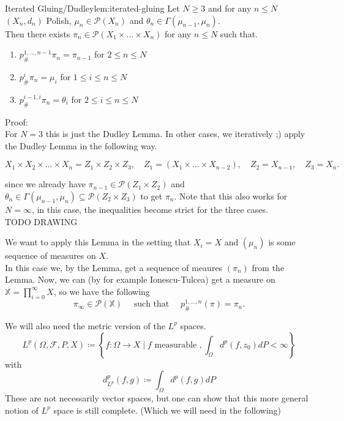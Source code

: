 \documentclass[15pt]{article}
\begin{document}
\begin{lemma}{Iterated Gluing/Dudley}{lem:iterated-gluing}
  Let $N \geq 3$ and for any $n \leq N$ $(X_n,d_n)$ Polish, $\mu_n \in \mathcal{P}(X_n)$ and $\theta_n \in \Gamma(\mu_{n-1},\mu_n)$. \\ 
  Then there exists $\pi_n \in \mathcal{P}(X_1\times ... \times X_n)$ for any $n \leq N$ such that.
  \begin{enumerate}
      \item $p^{1,...,n-1}_{\#} \pi_n = \pi_{n-1}$ for $2 \leq n \leq N$
      \item $p^i_{\#} \pi_n = \mu_i$ for $1 \leq i \leq n \leq N$
      \item $p^{i-1,i}_{\#} \pi_n = \theta_i$ for $2 \leq i\leq n \leq N$
  \end{enumerate}
\end{lemma}

Proof: 
\vspace{0.3cm} \\

For $N = 3$ this is just the Dudley Lemma. In other cases, we iteratively ;) apply the Dudley Lemma in the following way. 

$$X_1 \times X_2 \times ... \times X_n = Z_1 \times Z_2 \times Z_3, \quad Z_1 = (X_1 \times ... \times X_{n-2}), \quad Z_2 = X_{n-1}, \quad Z_3 = X_n.$$

since we already have $\pi_{n-1} \in \mathcal{P}(Z_1 \times Z_2)$ and $\theta_n \in \Gamma(\mu_{n-1}, \mu_{n}) \subseteq \mathcal{P}(Z_2 \times Z_3)$ to get $\pi_n$. Note that this also works for $N = \infty$, in this case, the inequalities become strict for the three cases. \\
TODO DRAWING

\bigbreak

We want to apply this Lemma in the setting that $X_i =X$ and $(\mu_n)$ is some sequence of measures on $X$. \\
In this case we, by the Lemma, get a sequence of meaures $(\pi_n)$ from the Lemma. Now, we can (by for example Ionescu-Tulcea) get a measure on $\mathbb{X} = \prod_{i = 0}^\infty X$, so we have the following $$\pi_\infty \in \mathcal{P}(\mathbb{X}) \quad \text{ such that } \quad p^{1,...,n}_{\#}(\pi) = \pi_n.$$

We will also need the metric version of the $L^p$ spaces.
$$L^p(\Omega,\mathcal{F}, P, X) \coloneqq \left\{ f : \Omega \rightarrow X \mid f \text{ measurable }, \int_\Omega d^p(f,z_0) d P < \infty \right\}$$ with$$d_{L^p}^p(f,g) \coloneqq \int_\Omega d^p(f,g) dP$$
These are not necessarily vector spaces, but one can show that this more general notion of $L^p$ space is still complete. (Which we will need in the following)
\end{document}
